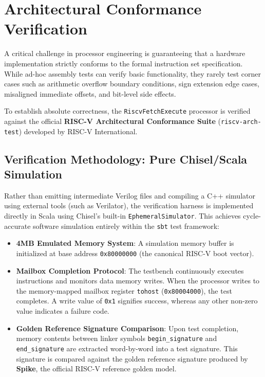

\section{Architectural Conformance Verification}\label{riscvConformance}

A critical challenge in processor engineering is guaranteeing that a hardware implementation strictly conforms to the formal instruction set specification. While ad-hoc assembly tests can verify basic functionality, they rarely test corner cases such as arithmetic overflow boundary conditions, sign extension edge cases, misaligned immediate offsets, and bit-level side effects.

To establish absolute correctness, the \texttt{RiscvFetchExecute} processor is verified against the official \textbf{RISC-V Architectural Conformance Suite} (\texttt{riscv-arch-test}) developed by RISC-V International.

\subsection{Verification Methodology: Pure Chisel/Scala Simulation}

Rather than emitting intermediate Verilog files and compiling a C++ simulator using external tools (such as Verilator), the verification harness is implemented directly in Scala using Chisel's built-in \texttt{EphemeralSimulator}. This achieves cycle-accurate software simulation entirely within the \texttt{sbt} test framework:
\begin{itemize}
    \item \textbf{4MB Emulated Memory System}: A simulation memory buffer is initialized at base address \texttt{0x80000000} (the canonical RISC-V boot vector).
    \item \textbf{Mailbox Completion Protocol}: The testbench continuously executes instructions and monitors data memory writes. When the processor writes to the memory-mapped mailbox register \texttt{tohost} (\texttt{0x80004000}), the test completes. A write value of \texttt{0x1} signifies success, whereas any other non-zero value indicates a failure code.
    \item \textbf{Golden Reference Signature Comparison}: Upon test completion, memory contents between linker symbols \texttt{begin\_signature} and \texttt{end\_signature} are extracted word-by-word into a test signature. This signature is compared against the golden reference signature produced by \textbf{Spike}, the official RISC-V reference golden model.
\end{itemize}

